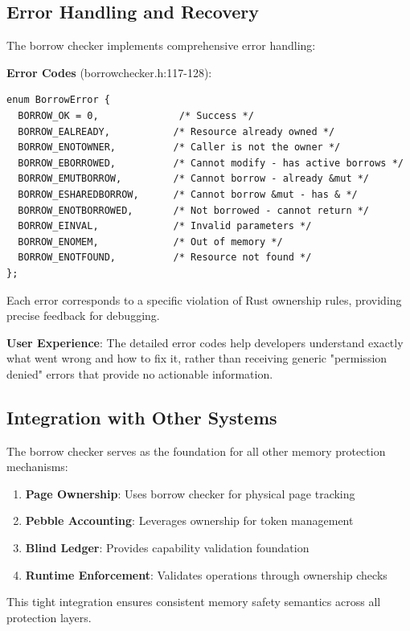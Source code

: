 \documentclass[11pt,letterpaper]{article}
\begin{document}
\subsection{Error Handling and Recovery}

The borrow checker implements comprehensive error handling:

\textbf{Error Codes} (borrowchecker.h:117-128):

\begin{lstlisting}
enum BorrowError {
  BORROW_OK = 0,              /* Success */
  BORROW_EALREADY,           /* Resource already owned */
  BORROW_ENOTOWNER,          /* Caller is not the owner */
  BORROW_EBORROWED,          /* Cannot modify - has active borrows */
  BORROW_EMUTBORROW,         /* Cannot borrow - already &mut */
  BORROW_ESHAREDBORROW,      /* Cannot borrow &mut - has & */
  BORROW_ENOTBORROWED,       /* Not borrowed - cannot return */
  BORROW_EINVAL,             /* Invalid parameters */
  BORROW_ENOMEM,             /* Out of memory */
  BORROW_ENOTFOUND,          /* Resource not found */
};
\end{lstlisting}

Each error corresponds to a specific violation of Rust ownership rules, providing precise feedback for debugging.

\textbf{User Experience}: The detailed error codes help developers understand exactly what went wrong and how to fix it, rather than receiving generic "permission denied" errors that provide no actionable information.

\subsection{Integration with Other Systems}

The borrow checker serves as the foundation for all other memory protection mechanisms:

\begin{enumerate}
\item \textbf{Page Ownership}: Uses borrow checker for physical page tracking
\item \textbf{Pebble Accounting}: Leverages ownership for token management
\item \textbf{Blind Ledger}: Provides capability validation foundation
\item \textbf{Runtime Enforcement}: Validates operations through ownership checks
\end{enumerate}

This tight integration ensures consistent memory safety semantics across all protection layers.
\end{document}
